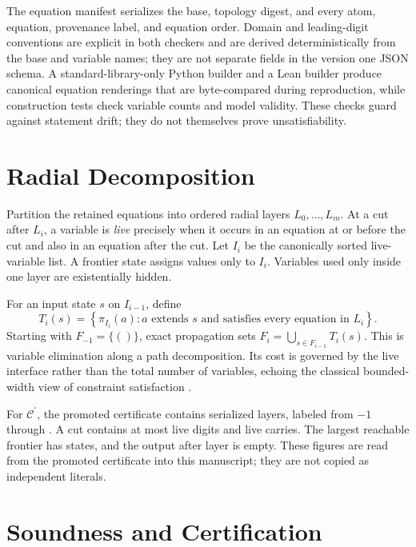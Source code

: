 \documentclass[11pt]{article}
\newcommand{\Ccore}{\ensuremath{\mathcal{C}^{\prime}}}
\begin{document}
The equation manifest serializes the base, topology digest, and every atom,
equation, provenance label, and equation order.  Domain and leading-digit conventions are explicit in both checkers and are derived deterministically
from the base and variable names; they are not separate fields in the version
one JSON schema.  A standard-library-only Python builder and a Lean builder
produce canonical equation renderings that are byte-compared during
reproduction, while construction tests check variable counts and model
validity.  These checks guard against statement drift; they do not themselves
prove unsatisfiability.

\section{Radial Decomposition}

Partition the retained equations into ordered radial layers
$L_0,\ldots,L_m$.  At a cut after $L_i$, a variable is \emph{live} precisely
when it occurs in an equation at or before the cut and also in an equation
after the cut.  Let $I_i$ be the canonically sorted live-variable list.  A
frontier state assigns values only to $I_i$.  Variables used only inside one
layer are existentially hidden.

For an input state $s$ on $I_{i-1}$, define
\[
  T_i(s)=\left\{\pi_{I_i}(a):
  a\text{ extends }s\text{ and satisfies every equation in }L_i\right\}.
\]
Starting with $F_{-1}=\{()\}$, exact propagation sets
$F_i=\bigcup_{s\in F_{i-1}}T_i(s)$.  This is variable elimination along a
path decomposition.  Its cost is governed by the live interface rather than
the total number of variables, echoing the classical bounded-width view of
constraint satisfaction \cite{Freuder1990,DechterPearl1989}.

For \Ccore, the promoted certificate contains \RadialLayerCount{} serialized
layers, labeled from $-1$ through \TerminalLayer.  A cut contains at most
\MaximumFrontierDigits{} live digits and \MaximumFrontierCarries{} live
carries.  The largest reachable frontier has \PeakReachableStates{} states,
and the output after layer \TerminalLayer{} is empty.  These figures are read
from the promoted certificate into this manuscript; they are not copied as
independent literals.

\section{Soundness and Certification}
\end{document}

